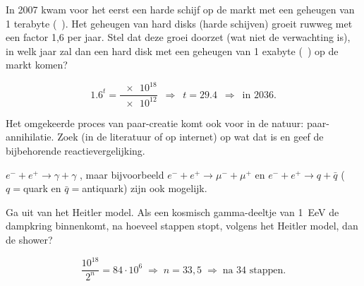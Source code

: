 \begin{questions}
\question In 2007 kwam voor het eerst een harde schijf op de markt met een
geheugen van 1 terabyte (\si{\tera\byte}). Het geheugen van hard disks
(harde schijven) groeit ruwweg met een factor 1,6 per jaar. Stel dat
deze groei doorzet (wat niet de verwachting is), in welk jaar zal dan
een hard disk met een geheugen van 1 exabyte (\si{\exa\byte}) op de
markt komen?
\begin{solution}
\begin{equation}
    \num{1.6}^t = \frac{\num{e18}}{\num{e12}} \, \, \,
    \Rightarrow \, \, \, t = \num{29.4} \,\,\,
    \Rightarrow \, \, \, \textrm{in } 2036. \nonumber
\end{equation}
\end{solution}




\question Het omgekeerde proces van paar-creatie komt ook voor in de natuur:
paar-annihilatie. Zoek (in de literatuur of op internet) op wat dat is
en geef de bijbehorende reactievergelijking.
\begin{solution}
$e^- + e^+ \rightarrow \gamma + \gamma$ ,  maar bijvoorbeeld
$e^- + e^+ \rightarrow \mu^- + \mu^+$ en
$e^- + e^+ \rightarrow q + \bar{q}$ ($q=$quark en $\bar{q}=$antiquark)
zijn ook mogelijk.
\end{solution}



\question Ga uit van het Heitler model. Als een kosmisch gamma-deeltje van
\SI{1}{\exa\electronvolt} de dampkring binnenkomt, na hoeveel stappen
stopt, volgens het Heitler model, dan de shower?
\begin{solution}
\begin{equation}
\frac{10^{18}}{2^n}=84 \cdot 10^6
\;\Rightarrow\; n=33,5
\;\Rightarrow\; \textrm{na } 34 \textrm{ stappen}. \nonumber
\end{equation}
\end{solution}



\end{questions}
